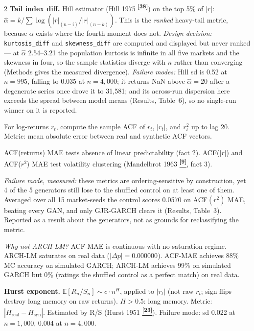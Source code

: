 \documentclass[10pt]{article}
\newcommand{\navybox}[2]{\begin{tcolorbox}[mybox={Navy}{LBg},title={#1}]#2\end{tcolorbox}}
\newcommand{\purplebox}[2]{\begin{tcolorbox}[mybox={Purple}{LBg},title={#1}]#2\end{tcolorbox}}
\newcommand{\tcite}[1]{%
  \hyperlink{R:#1}{\textsuperscript{\scriptsize\textbf{[#1]}}}}
\newcommand{\E}{\mathbb{E}}
\begin{document}
\begin{multicols}{2}
{\smallskip
\textbf{Tail index diff.} Hill estimator (Hill 1975\tcite{38}) on the top 5\% of $|r|$: $\hat{\alpha} = k/\sum \log(|r|_{(n-i)}/|r|_{(n-k)})$. This is the \emph{ranked} heavy-tail metric, because $\alpha$ exists where the fourth moment does not. \textit{Design decision:} \texttt{kurtosis\_diff} and \texttt{skewness\_diff} are computed and displayed but never ranked --- at $\hat\alpha$ 2.54--3.21 the population kurtosis is infinite in all five markets and the skewness in four, so the sample statistics diverge with $n$ rather than converging (Methods gives the measured divergence). \textit{Failure modes:} Hill sd is 0.52 at $n=995$, falling to 0.035 at $n=4{,}000$; it returns NaN above $\hat\alpha=20$ after a degenerate series once drove it to 31{,}581; and its across-run dispersion here exceeds the spread between model means (Results, Table~6), so no single-run winner on it is reported.}

\columnbreak

\purplebox{Temporal Group: ACF-MAE Triple}{%
For log-returns $r_t$, compute the sample ACF of $r_t$, $|r_t|$, and $r_t^2$ up to lag 20. Metric: mean absolute error between real and synthetic ACF vectors.

ACF(returns) MAE tests absence of linear predictability (fact 2). ACF($|r|$) and ACF($r^2$) MAE test volatility clustering (Mandelbrot 1963\tcite{9}, fact 3).

\textit{Failure mode, measured:} these metrics are ordering-sensitive by construction, yet 4 of the 5 generators still lose to the shuffled control on at least one of them. Averaged over all 15 market-seeds the control scores 0.0570 on ACF$(r^2)$ MAE, beating every GAN, and only GJR-GARCH clears it (Results, Table~3). Reported as a result about the generators, not as grounds for reclassifying the metric.

\textit{Why not ARCH-LM?} ACF-MAE is continuous with no saturation regime. ARCH-LM saturates on real data ($|\Delta p| = 0.000000$). ACF-MAE achieves 88\% MC accuracy on simulated GARCH; ARCH-LM achieves 99\% on simulated GARCH but 0\% (ratings the shuffled control as a perfect match) on real data.}

\navybox{Temporal Group: Hurst and Residual Kurtosis}{%
\textbf{Hurst exponent.} $\E[R_n/S_n] \sim c\cdot n^H$, applied to $|r_t|$ (not raw $r_t$; sign flips destroy long memory on raw returns). $H>0.5$: long memory. Metric: $|H_\text{real} - H_\text{syn}|$. Estimated by R/S (Hurst 1951\tcite{23}). Failure mode: sd 0.022 at $n=1{,}000$, 0.004 at $n=4{,}000$.

}
\end{multicols}
\end{document}

